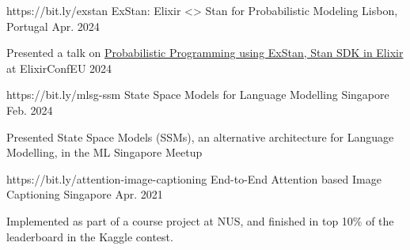 


\begin{cventries}


  \cventry
    {https://bit.ly/exstan}
    {ExStan: Elixir <> Stan for Probabilistic Modeling} %
    {Lisbon, Portugal} %
    {Apr. 2024} %
    {
      \begin{cvitems} %
        \item {Presented a talk on \href{https://github.com/goodhamgupta/ex_stan}{Probabilistic Programming using ExStan, Stan SDK in Elixir} at ElixirConfEU 2024 }
      \end{cvitems}
    }

  \cventry
    {https://bit.ly/mlsg-ssm}
    {State Space Models for Language Modelling} %
    {Singapore} %
    {Feb. 2024} %
    {
      \begin{cvitems} %
        \item {Presented State Space Models (SSMs), an alternative architecture for Language Modelling, in the ML Singapore Meetup }
      \end{cvitems}
    }


  \cventry
    {https://bit.ly/attention-image-captioning}
    {End-to-End Attention based Image Captioning} %
    {Singapore} %
    {Apr. 2021} %
    {
      \begin{cvitems} %
        \item {Implemented as part of a course project at NUS, and finished in top 10\% of the leaderboard in the Kaggle contest. }
      \end{cvitems}
    }


\end{cventries}
